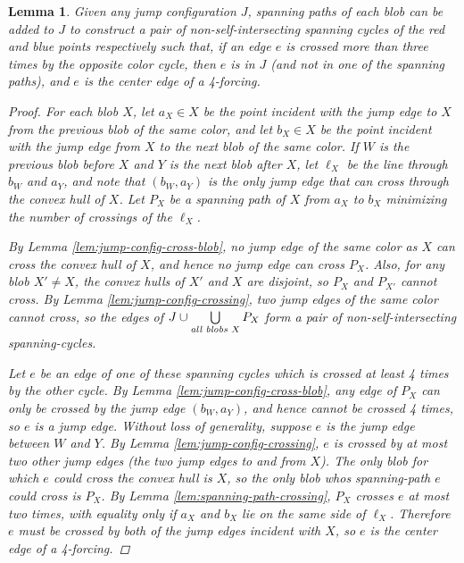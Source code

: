 \documentclass[12pt]{article}
\newtheorem{lemma}{Lemma}
\theoremstyle{definition}
\begin{document}
\begin{lemma}
  \label{lem:complete-jump-config}
  Given any jump configuration $J$,
  spanning paths of each blob can be added to $J$ to construct a pair of non-self-intersecting spanning cycles of the red and blue points respectively such that, if an edge $e$ is crossed more than three times by the opposite color cycle, then $e$ is in $J$ (and not in one of the spanning paths), and $e$ is the center edge of a 4-forcing.
  \begin{proof}
For each blob $X$, let $a_X\in X$ be the point incident with the jump edge to $X$ from the previous blob of the same color, and let $b_X\in X$ be the point incident with the jump edge from $X$ to the next blob of the same color.
    If $W$ is the previous blob before $X$ and $Y$ is the next blob after $X$, let $\ell_X$ be the line through $b_W$ and $a_Y$, and note that $(b_W,a_Y)$ is the only jump edge that can cross through the convex hull of $X$.
    Let $P_X$ be a spanning path of $X$ from $a_X$ to $b_X$ minimizing the number of crossings of the $\ell_X$.

    By Lemma \ref{lem:jump-config-cross-blob}, no jump edge of the same color as $X$ can cross the convex hull of $X$, and hence no jump edge can cross $P_X$.
    Also, for any blob $X'\neq X$, the convex hulls of $X'$ and $X$ are disjoint, so $P_X$ and $P_{X'}$ cannot cross.
    By Lemma \ref{lem:jump-config-crossing}, two jump edges of the same color cannot cross, so the edges of  $J\cup \bigcup\limits_{\emph{all blobs $X$}}P_X$ form a pair of non-self-intersecting spanning-cycles.

    Let $e$ be an edge of one of these spanning cycles which is crossed at least 4 times by the other cycle.
    By Lemma \ref{lem:jump-config-cross-blob}, any edge of $P_X$ can only be crossed by the jump edge $(b_W,a_Y)$, and hence cannot be crossed 4 times, so $e$ is a jump edge.
    Without loss of generality, suppose $e$ is the jump edge between $W$ and $Y$.
    By Lemma \ref{lem:jump-config-crossing}, $e$ is crossed by at most two other jump edges (the two jump edges to and from $X$).
    The only blob for which $e$ could cross the convex hull is $X$, so the only blob whos spanning-path $e$ could cross is $P_X$.
    By Lemma \ref{lem:spanning-path-crossing}, $P_X$ crosses $e$ at most two times, with equality only if $a_X$ and $b_X$ lie on the same side of $\ell_X$.
    Therefore $e$ must be crossed by both of the jump edges incident with $X$, so $e$ is the center edge of a 4-forcing.
  \end{proof}
\end{lemma}
\end{document}
